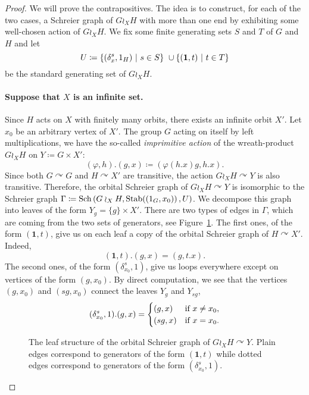 %
%
\begin{proof}
We will prove the contrapositives. The idea is to construct, for each of the two cases, a Schreier graph of $G\wr_XH$ with more than one end by exhibiting some well-chosen action of $G\wr_XH$.
We fix some finite generating sets $S$ and $T$ of $G$ and $H$ and let
\[
	U\coloneqq\setst{(\delta_x^s,1_H)}{s \in S} \cup \setst{(\mathbf 1,t)}{t \in T}
\]
be the standard generating set of $G\wr_XH$.
%
%
%
\paragraph{Suppose that $X$ is an infinite set.}
Since $H$ acts on $X$ with finitely many orbits, there exists an infinite orbit $X'$.
Let $x_0$ be an arbitrary vertex of $X'$.
The group $G$ acting on itself by left multiplications, we have the so-called \emph{imprimitive action} of the wreath-product $G\wr_XH$ on $Y\coloneqq G\times X'$:
\[
	(\varphi,h). (g,x) \coloneqq (\varphi(h.x)g, h.x).
\]
Since both $G\curvearrowright G$ and $H\curvearrowright X'$ are transitive, the action $G\wr_XH\curvearrowright Y$ is also transitive.
Therefore, the orbital Schreier graph of $G\wr_XH\curvearrowright Y$ is isomorphic to the Schreier graph $\Gamma\coloneqq\operatorname{Sch}\left(G\wr_XH, \operatorname{Stab}((1_G,x_0)\right), U)$. We decompose this graph into leaves of the form $Y_g = \{ g \} \times X'$. There are two types of edges in $\Gamma$, which are coming from the two sets of generators, see Figure~\ref{Figure:Leaves}. The first ones, of the form $(\mathbf 1,t)$, give us on each leaf a copy of the orbital Schreier graph of $H \curvearrowright X'$. Indeed,
\[
	(\mathbf 1,t).(g,x) = (g, t.x).
\]
The second ones, of the form $(\delta_{x_0}^s,1)$, give us loops everywhere except on vertices of the form $(g,x_0)$. By direct computation, we see that the vertices $(g,x_0)$ and $(sg,x_0)$ connect the leaves $Y_g$ and $Y_{sg}$,
\[
	(\delta_{x_0}^s,1).(g,x) =
		\begin{cases}
		(g,x) & \textnormal{if }x \neq x_0, \\
		(sg, x) & \textnormal{if }x = x_0.
		\end{cases}
\]
%
%
\begin{figure}[htbp]\centering
\scalebox{0.85}{
}
\caption{The leaf structure of the orbital Schreier graph of $G\wr_XH \curvearrowright Y$. Plain edges correspond to generators of the form $(\mathbf 1,t)$ while dotted edges correspond to generators of the form $(\delta_{x_0}^s,1)$.}
\label{Figure:Leaves}
\end{figure}
%
%


\end{proof}
